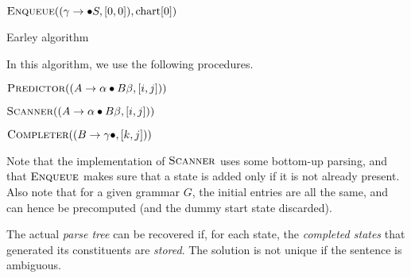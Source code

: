 \begin{algorithm}[H]
	\DontPrintSemicolon
	\SetAlgoLined
	\(\textsc{Enqueue}((\gamma \to \bullet S, [0, 0]), \textnormal{chart}[0])\) 
	\caption{Earley algorithm}
\end{algorithm}
In this algorithm, we use the following procedures.

\renewcommand{\algorithmcfname}{Procedure}
\begin{algorithm}[H]
	\DontPrintSemicolon
	\SetAlgoLined
	\caption{\(\textsc{Predictor}((A \to \alpha \bullet B \beta, [i, j]))\)}
\end{algorithm}
\begin{algorithm}[H]
	\DontPrintSemicolon
	\SetAlgoLined
	\caption{\(\textsc{Scanner}((A \to \alpha \bullet B \beta, [i, j]))\)}
\end{algorithm}
\begin{algorithm}[H]
	\DontPrintSemicolon
	\SetAlgoLined
	\caption{\(\textsc{Completer}((B \to \gamma\bullet, [k, j]))\)}
\end{algorithm}
Note that the implementation of \(\textsc{Scanner}\) uses some bottom-up parsing, and that \(\textsc{Enqueue}\) makes sure that a state is added only if it is not already present.
Also note that for a given grammar \(G\), the initial entries are all the same, and can hence be precomputed (and the dummy start state discarded).
\renewcommand{\algorithmcfname}{Algorithm}

The actual \emph{parse tree} can be recovered if, for each state, the \emph{completed states} that generated its constituents are \emph{stored}.
The solution is not unique if the sentence is ambiguous.

